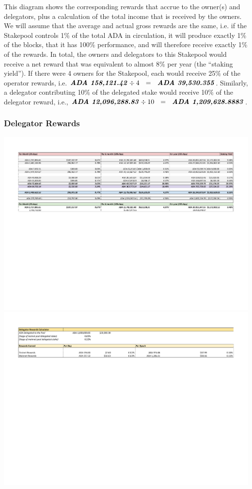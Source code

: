 \documentclass[11pt,a4paper,dvipsnames,twosided,final]{article}
\newcommand{\ada}{ADA{}}
\newcommand{\ADA}[1]{\textbf{\emph{\ada~{#1}}}}
\begin{document}
\noindent
This diagram shows the corresponding rewards that accrue to the owner(s) and delegators,
plus a calculation of the total income that is received by the owners.  We will assume that the average
and actual gross rewards are the same, i.e. if the Stakepool controls 1\% of the total \ada{} in
circulation, it will produce exactly 1\% of the blocks, that it has 100\% performance, and will therefore receive exactly 1\% of the rewards.
In total, the
owners and delegators to this Stakepool would receive a net reward that was equivalent to almost 8\% per year
(the ``staking yield'').  If there were 4 owners for the Stakepool, each would receive
25\% of the operator rewards, i.e. $\ADA{158,121.42} \div 4 ~~=~~ \ADA{39,530.355}$.
Similarly, a delegator contributing 10\% of the delegated stake would receive 10\% of
the delegator reward, i.e., $\ADA{12,096,288.83} \div 10 ~~=~~ \ADA{1,209,628.8883}$.

\subsubsection*{Delegator Rewards}

\hspace{-0.65in}\begin{minipage}{\textwidth}
  \includegraphics[width=1.2\textwidth]{RCM5.pdf}
  \includegraphics[width=1.2\textwidth]{RCM6.pdf}
\end{minipage}
\end{document}
